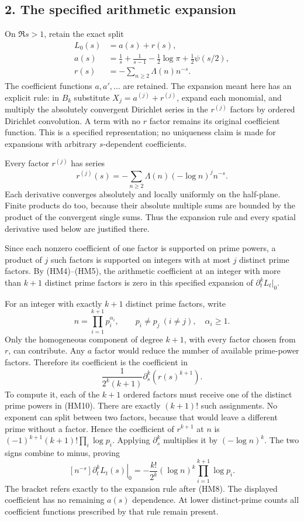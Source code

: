\documentclass[
  10pt,
  a4paper,
]{article}
\begin{document}
\subsection{2. The specified arithmetic
expansion}\label{the-specified-arithmetic-expansion}

On \(\Re s>1\), retain the exact split \[
\begin{split}
L_0(s)&=a(s)+r(s),\\
a(s)&=\frac1s+\frac1{s-1}-\frac12\log\pi+\frac12\psi(s/2),\\
r(s)&=-\sum_{n\ge2}\Lambda(n)n^{-s}.
\end{split}\tag{HM8}
\] The coefficient functions \(a,a',\ldots\) are retained. The expansion
meant here has an explicit rule: in \(B_k\) substitute
\(X_j=a^{(j)}+r^{(j)}\), expand each monomial, and multiply the
absolutely convergent Dirichlet series in the \(r^{(j)}\) factors by
ordered Dirichlet convolution. A term with no \(r\) factor remains its
original coefficient function. This is a specified representation; no
uniqueness claim is made for expansions with arbitrary \(s\)-dependent
coefficients.

Every factor \(r^{(j)}\) has series \[
r^{(j)}(s)=-\sum_{n\ge2}\Lambda(n)(-\log n)^j n^{-s}.
\tag{HM9}
\] Each derivative converges absolutely and locally uniformly on the
half-plane. Finite products do too, because their absolute multiple sums
are bounded by the product of the convergent single sums. Thus the
expansion rule and every spatial derivative used below are justified
there.

Since each nonzero coefficient of one factor is supported on prime
powers, a product of \(j\) such factors is supported on integers with at
most \(j\) distinct prime factors. By (HM4)--(HM5), the arithmetic
coefficient at an integer with more than \(k+1\) distinct prime factors
is zero in this specified expansion of \(\partial_t^kL_t|_0\).

For an integer with exactly \(k+1\) distinct prime factors, write \[
n=\prod_{i=1}^{k+1}p_i^{\alpha_i},\qquad
p_i\ne p_j\ (i\ne j),\quad\alpha_i\ge1.
\tag{HM10}
\] Only the homogeneous component of degree \(k+1\), with every factor
chosen from \(r\), can contribute. Any \(a\) factor would reduce the
number of available prime-power factors. Therefore its coefficient is
the coefficient in \[
\frac1{2^k(k+1)}\partial_s^k(r(s)^{k+1}).
\tag{HM11}
\] To compute it, each of the \(k+1\) ordered factors must receive one
of the distinct prime powers in (HM10). There are exactly \((k+1)!\)
such assignments. No exponent can split between two factors, because
that would leave a different prime without a factor. Hence the
coefficient of \(r^{k+1}\) at \(n\) is
\((-1)^{k+1}(k+1)!\prod_i\log p_i\). Applying \(\partial_s^k\)
multiplies it by \((-\log n)^k\). The two signs combine to minus,
proving \[
\boxed{[n^{-s}]\left.\partial_t^kL_t(s)\right|_0
=-\frac{k!}{2^k}(\log n)^k\prod_{i=1}^{k+1}\log p_i.}
\tag{HM12}
\] The bracket refers exactly to the expansion rule after (HM8). The
displayed coefficient has no remaining \(a(s)\) dependence. At lower
distinct-prime counts all coefficient functions prescribed by that rule
remain present.
\end{document}
